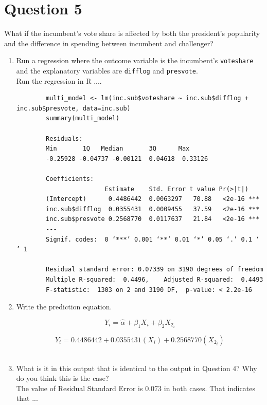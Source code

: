 \documentclass[12pt,letterpaper]{article}
\begin{document}
\section*{Question 5}
\noindent What if the incumbent's vote share is affected by both the president's popularity and the difference in spending between incumbent and challenger? 
	\begin{enumerate}
		\item Run a regression where the outcome variable is the incumbent's \texttt{voteshare} and the explanatory variables are \texttt{difflog} and \texttt{presvote}.	\\
		
		Run the regression in R ....
					\begin{verbatim}
		multi_model <- lm(inc.sub$voteshare ~ inc.sub$difflog + inc.sub$presvote, data=inc.sub)
		summary(multi_model)
		
		Residuals:
		Min       1Q   Median       3Q      Max 
		-0.25928 -0.04737 -0.00121  0.04618  0.33126 
		
		Coefficients:
						Estimate    Std. Error t value Pr(>|t|)    
		(Intercept)      0.4486442  0.0063297   70.88   <2e-16 ***
		inc.sub$difflog  0.0355431  0.0009455   37.59   <2e-16 ***
		inc.sub$presvote 0.2568770  0.0117637   21.84   <2e-16 ***
		---
		Signif. codes:  0 ‘***’ 0.001 ‘**’ 0.01 ‘*’ 0.05 ‘.’ 0.1 ‘ ’ 1
		
		Residual standard error: 0.07339 on 3190 degrees of freedom
		Multiple R-squared:  0.4496,	Adjusted R-squared:  0.4493 
		F-statistic:  1303 on 2 and 3190 DF,  p-value: < 2.2e-16
					\end{verbatim}
					
		\item Write the prediction equation.	
		
		{\large 			$$ {Y}_i = \hat{\alpha} +  {\beta_1}X_i + {\beta_2}X_{2_i} $$}
		
		
		{ $$ {Y}_i =  0.4486442 + 0.0355431(X_i) + 0.2568770 (X_{2_i} ) $$  } \\
		
		
		\item What is it in this output that is identical to the output in Question 4? Why do you think this is the case? \\
		
		The value of Residual Standard Error is 0.073 in both cases. That indicates that ...
		
	\end{enumerate}
\end{document}
